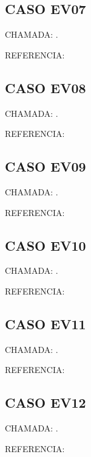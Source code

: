\documentclass{undftex}
\begin{document}
\begin{refsection}\section*{CASO EV07} CHAMADA: . \textcite{ev07}\par REFERENCIA:\par\printbibliography[heading=none,check=undfconsultadas]\end{refsection}\clearpage
\begin{refsection}\section*{CASO EV08} CHAMADA: . \textcite{ev08}\par REFERENCIA:\par\printbibliography[heading=none,check=undfconsultadas]\end{refsection}\clearpage
\begin{refsection}\section*{CASO EV09} CHAMADA: . \textcite{ev09}\par REFERENCIA:\par\printbibliography[heading=none,check=undfconsultadas]\end{refsection}\clearpage
\begin{refsection}\section*{CASO EV10} CHAMADA: . \textcite{ev10}\par REFERENCIA:\par\printbibliography[heading=none,check=undfconsultadas]\end{refsection}\clearpage
\begin{refsection}\section*{CASO EV11} CHAMADA: . \textcite{ev11}\par REFERENCIA:\par\printbibliography[heading=none,check=undfconsultadas]\end{refsection}\clearpage
\begin{refsection}\section*{CASO EV12} CHAMADA: . \textcite{ev12}\par REFERENCIA:\par\printbibliography[heading=none,check=undfconsultadas]\end{refsection}\clearpage
\end{document}
